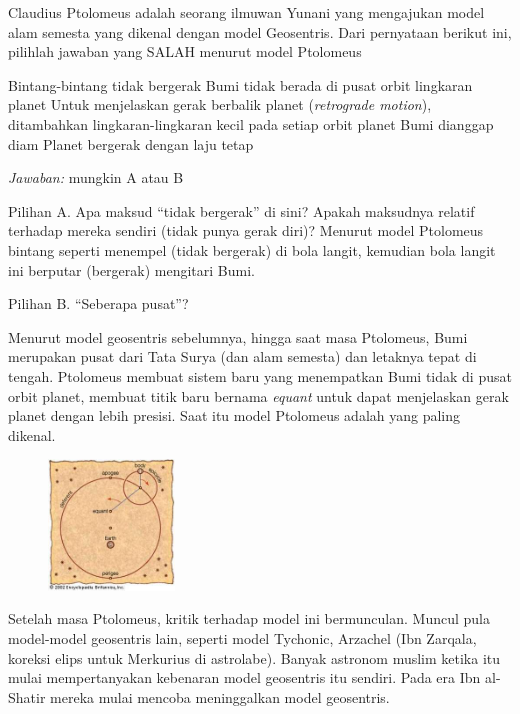 \documentclass[11pt,fleqn]{exam}
\begin{document}
\begin{questions}

\question Claudius Ptolomeus adalah seorang ilmuwan Yunani yang mengajukan model alam semesta yang dikenal dengan model Geosentris. Dari pernyataan berikut ini, pilihlah jawaban yang SALAH menurut model Ptolomeus
\begin{choices}
\choice Bintang-bintang tidak bergerak
\choice Bumi tidak berada di pusat orbit lingkaran planet
\choice Untuk menjelaskan gerak berbalik planet (\textit{retrograde motion}), ditambahkan lingkaran-lingkaran kecil pada setiap orbit planet
\choice Bumi dianggap diam
\choice Planet bergerak dengan laju tetap
\end{choices}


\textit{Jawaban: } mungkin A atau B

Pilihan A. Apa maksud ``tidak bergerak'' di sini? Apakah maksudnya relatif terhadap mereka sendiri (tidak punya gerak diri)? Menurut model Ptolomeus bintang seperti menempel (tidak bergerak) di bola langit, kemudian bola langit ini berputar (bergerak) mengitari Bumi. 

Pilihan B. ``Seberapa pusat''?

Menurut model geosentris sebelumnya, hingga saat masa Ptolomeus, Bumi merupakan pusat dari Tata Surya (dan alam semesta) dan letaknya tepat di tengah. Ptolomeus membuat sistem baru yang menempatkan Bumi tidak di pusat orbit planet, membuat titik baru bernama \textit{equant} untuk dapat menjelaskan gerak planet dengan lebih presisi. Saat itu model Ptolomeus adalah yang paling dikenal.
\begin{multicols}{2}
		\begin{figure}[H]
			\centering
			\includegraphics[width=0.3\textwidth]{ptolemic.jpg}
		\end{figure}
Setelah masa Ptolomeus, kritik terhadap model ini bermunculan. Muncul pula model-model geosentris lain, seperti model Tychonic, Arzachel (Ibn Zarqala, koreksi elips untuk Merkurius di astrolabe). Banyak astronom muslim ketika itu mulai mempertanyakan kebenaran model geosentris itu sendiri. Pada era Ibn al-Shatir mereka mulai mencoba meninggalkan model geosentris.
\end{multicols}





\end{questions}
\end{document}
